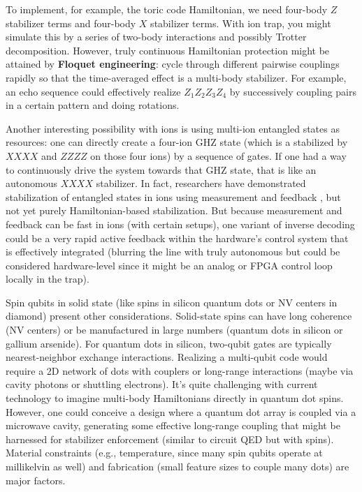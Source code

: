 \documentclass[11pt]{article}
\begin{document}
To implement, for example, the toric code Hamiltonian, we need four-body $Z$ stabilizer terms and four-body $X$ stabilizer terms. With ion trap, you might simulate this by a series of two-body interactions and possibly Trotter decomposition. However, truly continuous Hamiltonian protection might be attained by \textbf{Floquet engineering}: cycle through different pairwise couplings rapidly so that the time-averaged effect is a multi-body stabilizer. For example, an echo sequence could effectively realize $Z_1Z_2Z_3Z_4$ by successively coupling pairs in a certain pattern and doing rotations.

Another interesting possibility with ions is using multi-ion entangled states as resources: one can directly create a four-ion GHZ state (which is a stabilized by $XXXX$ and $ZZZZ$ on those four ions) by a sequence of gates. If one had a way to continuously drive the system towards that GHZ state, that is like an autonomous $XXXX$ stabilizer. In fact, researchers have demonstrated stabilization of entangled states in ions using measurement and feedback \cite{Negnevitsky2018}, but not yet purely Hamiltonian-based stabilization. But because measurement and feedback can be fast in ions (with certain setups), one variant of inverse decoding could be a very rapid active feedback within the hardware's control system that is effectively integrated (blurring the line with truly autonomous but could be considered hardware-level since it might be an analog or FPGA control loop locally in the trap).

Spin qubits in solid state (like spins in silicon quantum dots or NV centers in diamond) present other considerations. Solid-state spins can have long coherence (NV centers) or be manufactured in large numbers (quantum dots in silicon or gallium arsenide). For quantum dots in silicon, two-qubit gates are typically nearest-neighbor exchange interactions. Realizing a multi-qubit code would require a 2D network of dots with couplers or long-range interactions (maybe via cavity photons or shuttling electrons). It's quite challenging with current technology to imagine multi-body Hamiltonians directly in quantum dot spins. However, one could conceive a design where a quantum dot array is coupled via a microwave cavity, generating some effective long-range coupling that might be harnessed for stabilizer enforcement (similar to circuit QED but with spins). Material constraints (e.g., temperature, since many spin qubits operate at millikelvin as well) and fabrication (small feature sizes to couple many dots) are major factors.
\end{document}
